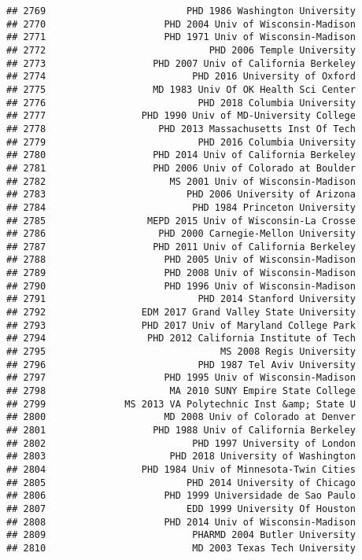 \documentclass[
]{article}
\begin{document}
\begin{verbatim}
## 2769                         PHD 1986 Washington University
## 2770                     PHD 2004 Univ of Wisconsin-Madison
## 2771                     PHD 1971 Univ of Wisconsin-Madison
## 2772                             PHD 2006 Temple University
## 2773                   PHD 2007 Univ of California Berkeley
## 2774                          PHD 2016 University of Oxford
## 2775                   MD 1983 Univ Of OK Health Sci Center
## 2776                           PHD 2018 Columbia University
## 2777                 PHD 1990 Univ of MD-University College
## 2778                    PHD 2013 Massachusetts Inst Of Tech
## 2779                           PHD 2016 Columbia University
## 2780                   PHD 2014 Univ of California Berkeley
## 2781                   PHD 2006 Univ of Colorado at Boulder
## 2782                      MS 2001 Univ of Wisconsin-Madison
## 2783                         PHD 2006 University of Arizona
## 2784                          PHD 1984 Princeton University
## 2785                  MEPD 2015 Univ of Wisconsin-La Crosse
## 2786                    PHD 2000 Carnegie-Mellon University
## 2787                   PHD 2011 Univ of California Berkeley
## 2788                     PHD 2005 Univ of Wisconsin-Madison
## 2789                     PHD 2008 Univ of Wisconsin-Madison
## 2790                     PHD 1996 Univ of Wisconsin-Madison
## 2791                           PHD 2014 Stanford University
## 2792                 EDM 2017 Grand Valley State University
## 2793                 PHD 2017 Univ of Maryland College Park
## 2794                  PHD 2012 California Institute of Tech
## 2795                               MS 2008 Regis University
## 2796                           PHD 1987 Tel Aviv University
## 2797                     PHD 1995 Univ of Wisconsin-Madison
## 2798                      MA 2010 SUNY Empire State College
## 2799              MS 2013 VA Polytechnic Inst &amp; State U
## 2800                     MD 2008 Univ of Colorado at Denver
## 2801                   PHD 1988 Univ of California Berkeley
## 2802                          PHD 1997 University of London
## 2803                      PHD 2018 University of Washington
## 2804                 PHD 1984 Univ of Minnesota-Twin Cities
## 2805                         PHD 2014 University of Chicago
## 2806                     PHD 1999 Universidade de Sao Paulo
## 2807                         EDD 1999 University Of Houston
## 2808                     PHD 2014 Univ of Wisconsin-Madison
## 2809                          PHARMD 2004 Butler University
## 2810                          MD 2003 Texas Tech University

\end{verbatim}
\end{document}
